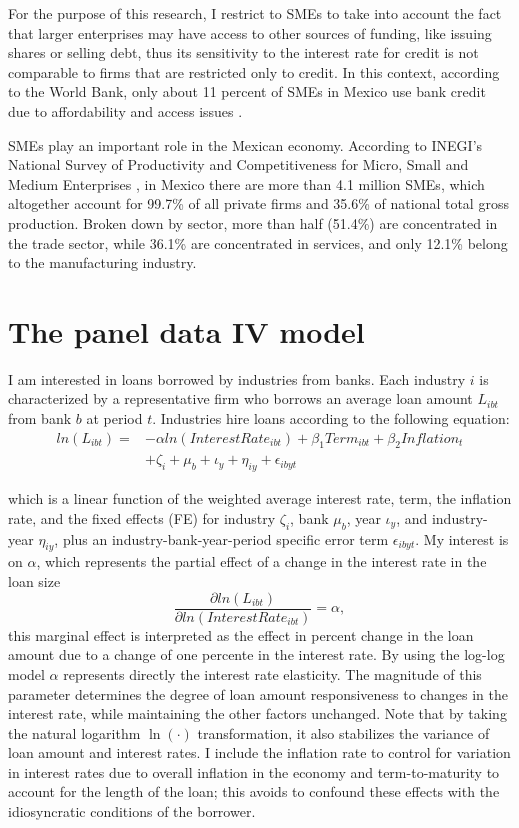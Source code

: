 \documentclass[11pt, oneside]{book}
\begin{document}
For the purpose of this research, I restrict to SMEs to take into account the fact that larger enterprises may have access to other sources of funding, like issuing shares or selling debt, thus its sensitivity to the interest rate for credit is not comparable to firms that are restricted only to credit.  In this context, according to the World Bank, only about 11 percent of SMEs in Mexico use bank credit due to affordability and access issues \citep{Belmont2021expanding}. 

SMEs play an important role in the Mexican economy. According to INEGI's National Survey of Productivity and Competitiveness for Micro, Small and Medium Enterprises \citep{INEGI2022021enaproce}, in Mexico there are more than 4.1 million SMEs, which altogether account for 99.7\% of all private firms and 35.6\% of national total gross production. Broken down by sector, more than half (51.4\%) are concentrated in the trade sector, while 36.1\% are concentrated in services, and only 12.1\% belong to the manufacturing industry.



\chapter{The panel data IV model} \label{sect3}
I am interested in loans borrowed by industries from banks. Each industry $i$ is characterized by a representative firm who borrows an average loan amount $L_{ibt}$ from bank $b$ at period $t$.  Industries hire loans according to the following equation:
\begin{align}
ln(L_{ibt}) = &- \alpha ln(InterestRate_{ibt})  + \beta_1 Term_{ibt} + \beta_2 Inflation_t  \nonumber \\
			& + \zeta_{i} + \mu_{b} + \iota_{y} + \eta_{iy} + \epsilon_{ibyt} 
\label{eq1}
\end{align}


which is a linear function of the weighted average interest rate, term, the inflation rate, and the fixed effects (FE) for industry $\zeta_{i}$, bank $\mu_{b}$, year $\iota_{y}$, and industry-year $\eta_{iy}$, plus an industry-bank-year-period specific error term $\epsilon_{ibyt}$. My interest is on $\alpha$, which represents the partial effect of a change in the interest rate in the loan size \[
\frac{\partial ln(L_{ibt})}{\partial ln(InterestRate_{ibt})} =  \alpha,
\]
this marginal effect is interpreted as the effect in percent change in the loan amount due to a change of one percente in the interest rate. By using the  log-log model $\alpha$ represents directly the interest rate elasticity. The magnitude of this parameter determines the degree of loan amount responsiveness to changes in the interest rate, while maintaining the other factors unchanged. Note that by taking the natural logarithm $\ln(\cdot)$ transformation, it also stabilizes the variance of loan amount and interest rates. I include the inflation rate to control for variation in interest rates due to overall inflation in the economy and term-to-maturity to account for the length of the loan; this avoids to confound these effects with the idiosyncratic conditions of the borrower. 
\end{document}
